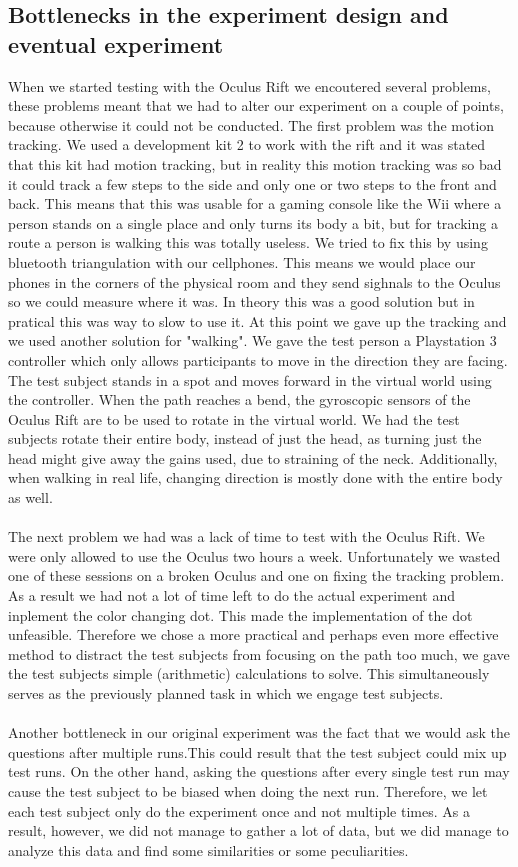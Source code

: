 \subsection{Bottlenecks in the experiment design and eventual experiment}
When we started testing with the Oculus Rift we encoutered several problems, these problems meant that we had to alter our experiment on a couple of points, because otherwise it could not be conducted. The first problem was the motion tracking. We used a development kit 2 to work with the rift and it was stated that this kit had motion tracking, but in reality this motion tracking was so bad it could track a few steps to the side and only one or two steps to the front and back. This means that this was usable for a gaming console like the Wii where a person stands on a single place and only turns its body a bit, but for tracking a route a person is walking this was totally useless. We tried to fix this by using bluetooth triangulation with our cellphones. This means we would place our phones in the corners of the physical room and they send sighnals to the Oculus so we could measure where it was. In theory this was a good solution but in pratical this was way to slow to use it. At this point we gave up the tracking and we used another solution for "walking". We gave the test person a Playstation 3 controller which only allows participants to move in the direction they are facing.
The test subject stands in a spot and moves forward in the virtual world using the controller.
When the path reaches a bend, the gyroscopic sensors of the Oculus Rift are to be used to rotate in the virtual world.
We had the test subjects rotate their entire body, instead of just the head, as turning just the head might give away the gains used, due to straining of the neck.
Additionally, when walking in real life, changing direction is mostly done with the entire body as well.\\
\\
The next problem we had was a lack of time to test with the Oculus Rift. We were only allowed to use the Oculus two hours a week. Unfortunately we wasted one of these sessions on a broken Oculus and one on fixing the tracking problem. As a result we had not a lot of time left to do the actual experiment and inplement the color changing dot. This made the implementation of the dot unfeasible. Therefore we chose a more practical and perhaps even more effective method to distract the test subjects from focusing on the path too much, we gave the test subjects simple (arithmetic) calculations to solve.
This simultaneously serves as the previously planned task in which we engage test subjects.\\
\\
Another bottleneck in our original experiment was the fact that we would ask the questions after multiple runs.This could result that the test subject could mix up test runs. On the other hand, asking the questions after every single test run may cause the test subject to be biased when doing the next run.
Therefore, we let each test subject only do the experiment once and not multiple times.
As a result, however, we did not manage to gather a lot of data, but we did manage to analyze this data and find some similarities or some peculiarities.
